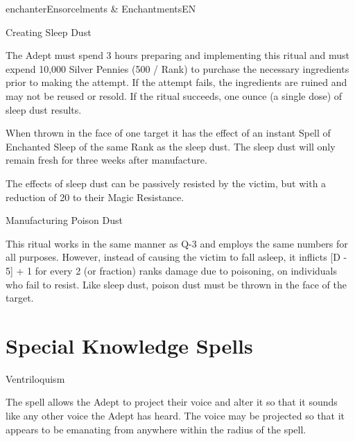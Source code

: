 \begin{College}[1.1]{enchanter}{Ensorcelments \& Enchantments}{EN}
\begin{ritual}[Q-3]{Creating Sleep Dust}

\begin{effects}
The Adept must spend 3 hours preparing and implementing this ritual
and must expend 10,000 Silver Pennies (500 / Rank) to purchase the
necessary ingredients prior to making the attempt.  If the attempt
fails, the ingredients are ruined and may not be reused or resold. If
the ritual succeeds, one ounce (a single dose) of sleep dust results.

When thrown in the face of one target it has the effect of an instant
Spell of Enchanted Sleep of the same Rank as the sleep dust.  The
sleep dust will only remain fresh for three weeks after manufacture.

The effects of sleep dust can be passively resisted by the victim, but
with a reduction of 20 to their Magic Resistance.
\end{effects}
\end{ritual}

\begin{ritual}[Q-4]{Manufacturing Poison Dust}
\begin{effects}
This ritual works in the same manner as Q-3 and employs the same
numbers for all purposes.  However, instead of causing the victim to
fall asleep, it inflicts [D - 5] + 1 for every 2 (or fraction) ranks
damage due to poisoning, on individuals who fail to resist.  Like
sleep dust, poison dust must be thrown in the face of the target.
\end{effects}
\end{ritual}


\section{Special Knowledge Spells}


\begin{spell}[S-1]{Ventriloquism}
\begin{effects}
The spell allows the Adept to project their voice and alter it so that
it sounds like any other voice the Adept has heard. The voice may be
projected so that it appears to be emanating from anywhere within the
radius of the spell.
\end{effects}
\end{spell}


\end{College}
